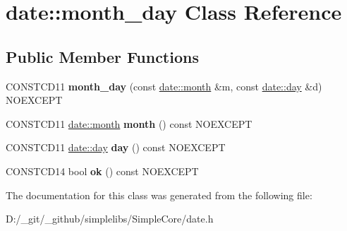 \hypertarget{classdate_1_1month__day}{}\section{date\+::month\+\_\+day Class Reference}
\label{classdate_1_1month__day}
\subsection*{Public Member Functions}
\begin{DoxyCompactItemize}
\item 
\mbox{\label{classdate_1_1month__day_a785bde00e2147d3ffe441bf0c96633d0}} 
C\+O\+N\+S\+T\+C\+D11 {\bfseries month\+\_\+day} (const \mbox{\hyperlink{classdate_1_1month}{date\+::month}} \&m, const \mbox{\hyperlink{classdate_1_1day}{date\+::day}} \&d) N\+O\+E\+X\+C\+E\+PT
\item 
\mbox{\label{classdate_1_1month__day_af952c1e818338767d604149da004a51f}} 
C\+O\+N\+S\+T\+C\+D11 \mbox{\hyperlink{classdate_1_1month}{date\+::month}} {\bfseries month} () const N\+O\+E\+X\+C\+E\+PT
\item 
\mbox{\label{classdate_1_1month__day_a432794a534c22f58e87a80063a35a2a8}} 
C\+O\+N\+S\+T\+C\+D11 \mbox{\hyperlink{classdate_1_1day}{date\+::day}} {\bfseries day} () const N\+O\+E\+X\+C\+E\+PT
\item 
\mbox{\label{classdate_1_1month__day_a0f732ad825dcfaf949e43f336ef39632}} 
C\+O\+N\+S\+T\+C\+D14 bool {\bfseries ok} () const N\+O\+E\+X\+C\+E\+PT
\end{DoxyCompactItemize}


The documentation for this class was generated from the following file\+:\begin{DoxyCompactItemize}
\item 
D\+:/\+\_\+git/\+\_\+github/simplelibs/\+Simple\+Core/date.\+h\end{DoxyCompactItemize}
